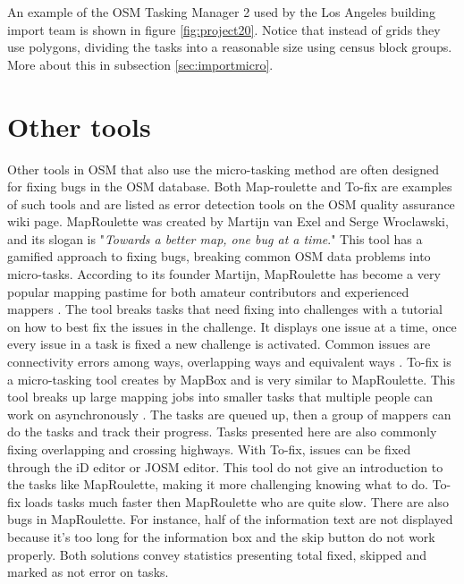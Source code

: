 An example of the OSM Tasking Manager 2 used by the Los Angeles building import team is shown in figure \ref{fig:project20}. Notice that instead of grids they use polygons, dividing the tasks into a reasonable size using census block groups. More about this in subsection \ref{sec:importmicro}. 

\section{Other tools}
Other tools in OSM that also use the micro-tasking method are often designed for fixing bugs in the OSM database. Both Map-roulette and To-fix are examples of such tools and are listed as error detection tools on the OSM quality assurance wiki page. MapRoulette was created by Martijn van Exel and Serge Wroclawski, and its slogan is "\textit{Towards a better map, one bug at a time}." This tool has a gamified approach to fixing bugs, breaking common OSM data problems into micro-tasks. According to its founder Martijn, MapRoulette has become a very popular mapping pastime for both amateur contributors and experienced mappers \cite{Exelvan2013}.  The tool breaks tasks that need fixing into challenges with a tutorial on how to best fix the issues in the challenge. It displays one issue at a time, once every issue in a task is fixed a new challenge is activated. Common issues are connectivity errors among ways, overlapping ways and equivalent ways \cite{OpenStreetMapk}. To-fix is a micro-tasking tool creates by MapBox and is very similar to MapRoulette. This tool breaks up large mapping jobs into smaller tasks that multiple people can work on asynchronously \cite{Lidman2014}. The tasks are queued up, then a group of mappers can do the tasks and track their progress. Tasks presented here are also commonly fixing overlapping and crossing highways. With To-fix, issues can be fixed through the iD editor or JOSM editor. This tool do not give an introduction to the tasks like MapRoulette, making it more challenging knowing what to do. To-fix loads tasks much faster then MapRoulette who are quite slow. There are also bugs in MapRoulette. For instance, half of the information text are not displayed because it's too long for the information box and the skip button do not work properly. Both solutions convey statistics presenting total fixed, skipped and marked as not error on tasks. 